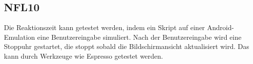 \subsection*{NFL10}
Die Reaktionszeit kann getestet werden, indem ein \Gls{Skript} auf einer \Gls{Android}-\Gls{Emulation} eine Benutzereingabe simuliert.
Nach der Benutzereingabe wird eine Stoppuhr gestartet, die stoppt sobald die Bildschirmansicht aktualisiert wird.
Das kann durch Werkzeuge wie \Gls{Espresso} getestet werden.